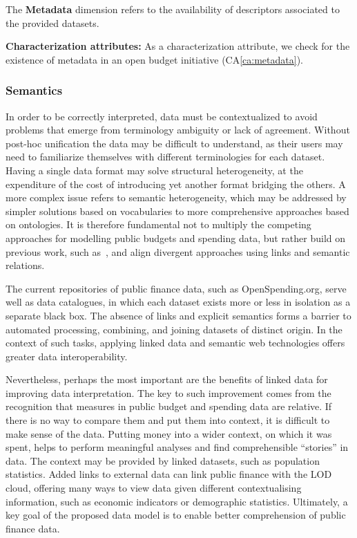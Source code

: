 		\begin{defn}The \textbf{Metadata} dimension refers to the availability of descriptors associated to the provided datasets.
		\end{defn}
		\noindent\textbf{Characterization attributes:}
As a characterization attribute, we check for the existence of metadata in an open budget initiative (CA\ref{ca:metadata}).

\vspace{.1cm}
	\subsubsection{Semantics}
In order to be correctly interpreted, data must be contextualized to avoid problems that emerge from terminology ambiguity or lack of agreement. 
Without post-hoc unification the data may be difficult to understand, as their users may need to familiarize themselves with different terminologies for each dataset.
Having a single data format may solve structural heterogeneity, at the expenditure of the cost of introducing yet another format bridging the others. 
A more complex issue refers to semantic heterogeneity, which may be addressed by simpler solutions based on vocabularies to more comprehensive approaches based on ontologies. 
It is therefore fundamental not to multiply the competing approaches for modelling public budgets and spending data, but rather build on previous work, such as~\cite{OpenSpending}, and align divergent approaches using links and semantic relations.

The current repositories of public finance data, such as OpenSpending.org, serve well as data catalogues, in which each dataset exists more or less in isolation as a separate black box. 
The absence of links and explicit semantics forms a barrier to automated processing, combining, and joining datasets of distinct origin. 
In the context of such tasks, applying linked data and semantic web technologies offers greater data interoperability. 

Nevertheless, perhaps the most important are the benefits of linked data for improving data interpretation. 
The key to such improvement comes from the recognition that measures in public budget and spending data are relative.
If there is no way to compare them and put them into context, it is difficult to make sense of the data.
Putting money into a wider context, on which it was spent, helps to perform meaningful analyses and find comprehensible ``stories'' in data. 
The context may be provided by linked datasets, such as population statistics. 
Added links to external data can link public finance with the LOD cloud, offering many ways to view data given different contextualising information, such as economic indicators or demographic statistics. 
Ultimately, a key goal of the proposed data model is to enable better comprehension of public finance data. 

